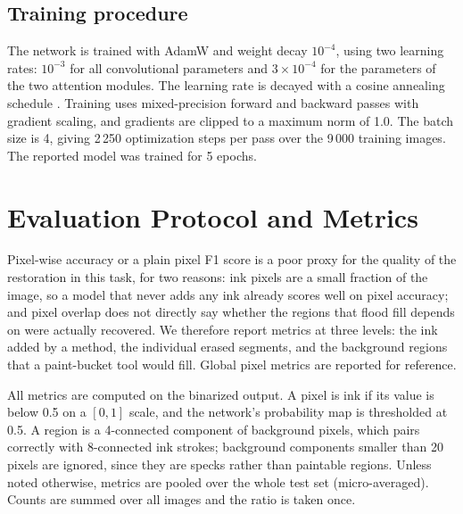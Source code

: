 \documentclass[preprint,12pt]{elsarticle}
\begin{document}
\subsection{Training procedure}

The network is trained with AdamW \citep{loshchilov2019adamw} and weight decay
$10^{-4}$, using two learning rates: $10^{-3}$ for all convolutional parameters and
$3\times 10^{-4}$ for the parameters of the two attention modules. The learning
rate is decayed with a cosine annealing schedule \citep{loshchilov2017sgdr}. Training uses mixed-precision forward and backward passes
with gradient scaling, and gradients are clipped to a maximum norm of 1.0. The batch
size is 4, giving 2\,250 optimization steps per pass over the 9\,000 training images.
The reported model was trained for 5 epochs.

\section{Evaluation Protocol and Metrics}
\label{sec:metrics}

Pixel-wise accuracy or a plain pixel F1 score is a poor proxy for the quality of the
restoration in this task, for two reasons: ink pixels are a small fraction of the
image, so a model that never adds any ink already scores well on pixel accuracy;
and pixel overlap does not directly say whether the regions that flood fill depends
on were actually recovered. We therefore report metrics at three levels: the ink
added by a method, the individual erased segments, and the background regions that a
paint-bucket tool would fill. Global pixel metrics are reported for reference.

All metrics are computed on the binarized output. A pixel is ink if its value is
below 0.5 on a $[0,1]$ scale, and the network's probability map is thresholded at
0.5. A region is a 4-connected component of background pixels, which pairs correctly
with 8-connected ink strokes; background components smaller than 20 pixels are
ignored, since they are specks rather than paintable regions. Unless
noted otherwise, metrics are pooled over the whole test set (micro-averaged). Counts
are summed over all images and the ratio is taken once.
\end{document}
